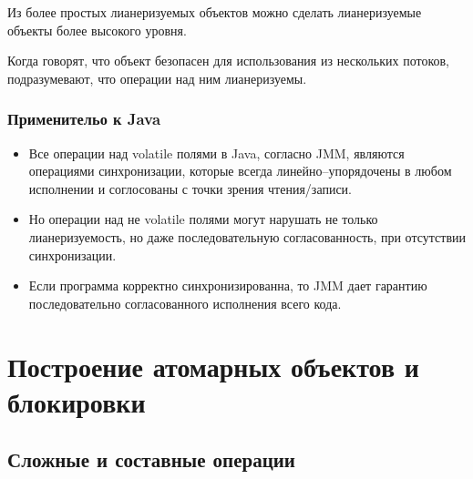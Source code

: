 \documentclass[10pt,a4paper,oneside,titlepage]{article}
\theoremstyle{plain}
\theoremstyle{defenition}
\begin{document}
Из более простых лианеризуемых объектов можно сделать лианеризуемые объекты более высокого уровня. 

Когда говорят, что объект безопасен для использования из нескольких потоков, подразумевают, что операции над ним лианеризуемы.

\subsubsection{Применительо к Java}
\begin{itemize}
	\item Все операции над volatile полями в Java, согласно JMM, являются операциями синхронизации, которые всегда линейно--упорядочены в любом исполнении и соглосованы с точки зрения чтения/записи.
	\item Но операции над не volatile полями могут нарушать не только лианеризуемость, но даже последовательную согласованность, при отсутствии синхронизации.
	\item Если программа корректно синхронизированна, то JMM дает гарантию последовательно согласованного исполнения всего кода. 
\end{itemize}

\section{Построение атомарных объектов и блокировки}
\subsection{Сложные и составные операции}
\end{document}
